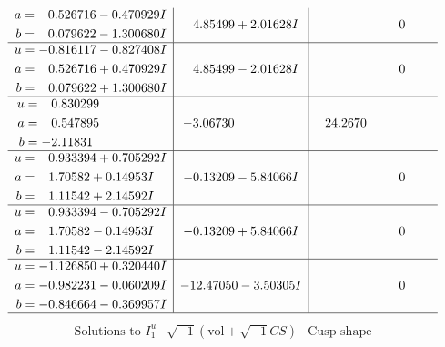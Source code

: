 \documentclass[1p]{elsarticle_modified}
\theoremstyle{definition}
\newcommand{\I}{\sqrt{-1}}
\begin{document}
$$\begin{array}{c|c|c}
\begin{aligned}
a &= \phantom{-}0.526716 - 0.470929 I \\
b &= \phantom{-}0.079622 - 1.300680 I\end{aligned}
 & \phantom{-}4.85499 + 2.01628 I & \phantom{-0.000000 } 0 \\ \hline\begin{aligned}
u &= -0.816117 - 0.827408 I \\
a &= \phantom{-}0.526716 + 0.470929 I \\
b &= \phantom{-}0.079622 + 1.300680 I\end{aligned}
 & \phantom{-}4.85499 - 2.01628 I & \phantom{-0.000000 } 0 \\ \hline\begin{aligned}
u &= \phantom{-}0.830299\phantom{ +0.000000I} \\
a &= \phantom{-}0.547895\phantom{ +0.000000I} \\
b &= -2.11831\phantom{ +0.000000I}\end{aligned}
 & -3.06730\phantom{ +0.000000I} & \phantom{-}24.2670\phantom{ +0.000000I} \\ \hline\begin{aligned}
u &= \phantom{-}0.933394 + 0.705292 I \\
a &= \phantom{-}1.70582 + 0.14953 I \\
b &= \phantom{-}1.11542 + 2.14592 I\end{aligned}
 & -0.13209 - 5.84066 I & \phantom{-0.000000 } 0 \\ \hline\begin{aligned}
u &= \phantom{-}0.933394 - 0.705292 I \\
a &= \phantom{-}1.70582 - 0.14953 I \\
b &= \phantom{-}1.11542 - 2.14592 I\end{aligned}
 & -0.13209 + 5.84066 I & \phantom{-0.000000 } 0 \\ \hline\begin{aligned}
u &= -1.126850 + 0.320440 I \\
a &= -0.982231 - 0.060209 I \\
b &= -0.846664 - 0.369957 I\end{aligned}
 & -12.47050 - 3.50305 I & \phantom{-0.000000 } 0\\
 \hline 
 \end{array}$$\newpage$$\begin{array}{c|c|c}  
\text{Solutions to }I^u_{1}& \I (\text{vol} + \sqrt{-1}CS) & \text{Cusp shape}\\
 \hline 
\begin{aligned}

\end{aligned}
\end{array}$$
\end{document}
